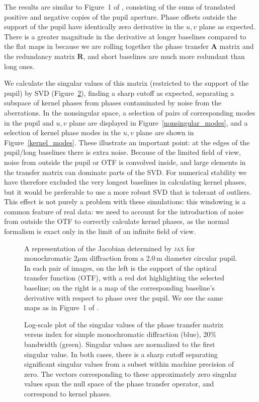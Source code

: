 \documentclass[modern]{aastex63}
\begin{document}
The results are similar to Figure~1 of \citet{martinache10}, consisting of the sums of translated positive and negative copies of the pupil aperture. Phase offsets outside the support of the pupil have identically zero derivative in the $u,v$ plane as expected. There is a greater magnitude in the derivative at longer baselines compared to the flat maps in \citet{martinache10} because we are rolling together the phase transfer $\mathbf{A}$ matrix and the redundancy matrix $\mathbf{R}$, and short baselines are much more redundant than long ones.

We calculate the singular values of this matrix (restricted to the support of the pupil) by SVD (Figure~\ref{fig:svd}), finding a sharp cutoff as expected, separating a subspace of kernel phases from phases contaminated by noise from the aberrations. In the nonsingular space, a selection of pairs of corresponding modes in the pupil and $u,v$ plane are displayed in Figure~\ref{nonsingular_modes}, and a selection of kernel phase modes in the $u,v$ plane are shown in Figure~\ref{kernel_modes}. These illustrate an important point: at the edges of the pupil/long baselines there is extra noise. Because of the limited field of view, noise from outside the pupil or OTF is convolved inside, and large elements in the transfer matrix can dominate parts of the SVD. For numerical stability we have therefore excluded the very longest baselines in calculating kernel phases, but it would be preferable to use a more robust SVD that is tolerant of outliers. This effect is not purely a problem with these simulations: this windowing is a common feature of real data: we need to account for the introduction of noise from outside the OTF to correctly calculate kernel phases, as the normal formalism is exact only in the limit of an infinite field of view. 

\begin{figure}
\caption{A representation of the Jacobian determined by \textsc{jax} for monochromatic 2$\mu$m diffraction from a 2.0\,m diameter circular pupil. In each pair of images, on the left is the support of the optical transfer function (OTF), with a red dot highlighting the selected baseline; on the right is a map of the corresponding baseline's derivative with respect to phase over the pupil. We see the same maps as in Figure~1 of \citet{martinache10}. \label{kernel_jacobian}}
\end{figure}

\begin{figure}
     \caption{Log-scale plot of the singular values of the phase transfer matrix versus index for simple monochromatic diffraction (blue), 20\% bandwidth (green). Singular values are normalized to the first singular value. In both cases, there is a sharp cutoff separating significant singular values from a subset within machine precision of zero. The vectors corresponding to these approximately zero singular values span the null space of the phase transfer operator, and correspond to kernel phases.}
    \label{fig:svd}
\end{figure}
\end{document}
